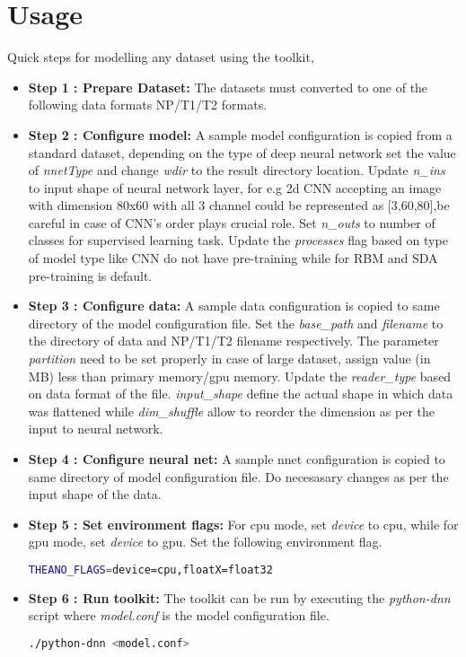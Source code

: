 \section{Usage}
Quick steps for modelling any dataset using the toolkit,
\begin{itemize}
	\item{\textbf{Step 1 : Prepare Dataset:} The datasets must converted to one of the following data formats NP/T1/T2 formats. }
	\item{\textbf{Step 2 : Configure model:} A sample model configuration is copied from a standard dataset, depending on the type of deep neural network set the value of \textit{nnetType} and change \textit{wdir} to the result directory location. Update \textit{n\_ins} to input shape of neural network layer, for e.g 2d CNN accepting an image with dimension 80x60 with all 3 channel could be represented as [3,60,80],be careful in case of CNN's order plays crucial role. Set \textit{n\_outs} to number of classes for supervised learning task. Update the \textit{processes} flag based on type of model type like CNN do not have pre-training while for RBM and SDA pre-training is default.}
	\item {\textbf{Step 3 : Configure data:} A sample data configuration is copied to same directory of the model configuration file. Set the \textit{base\_path} and \textit{filename} to the directory of data and NP/T1/T2 filename respectively. The parameter \textit{partition} need to be set properly in case of large dataset, assign value (in MB) less than primary memory/gpu memory. Update the \textit{reader\_type} based on data format of the file. \textit{input\_shape} define the actual shape in which data was flattened while \textit{dim\_shuffle} allow to reorder the dimension as per the input to neural network.}
	\item{\textbf{Step 4 : Configure neural net:} A sample nnet configuration is copied to same directory of model configuration file. Do necesasary changes as per the input shape of the data.}	
	\item{\textbf{Step 5 : Set environment flags:} For cpu mode, set \textit{device} to cpu, while for gpu mode, set \textit{device} to gpu. Set the following environment flag.
	\begin{lstlisting}[language=bash,basicstyle=\small] 
		THEANO_FLAGS=device=cpu,floatX=float32
	\end{lstlisting}} 
	
	\item{\textbf{Step 6 : Run toolkit:} The toolkit can be run by executing the \textit{python-dnn} script where \textit{model.conf} is the model configuration file.
	\begin{lstlisting}[language=bash,basicstyle=\small] 
		./python-dnn <model.conf>
	\end{lstlisting}	} 
\end{itemize}


